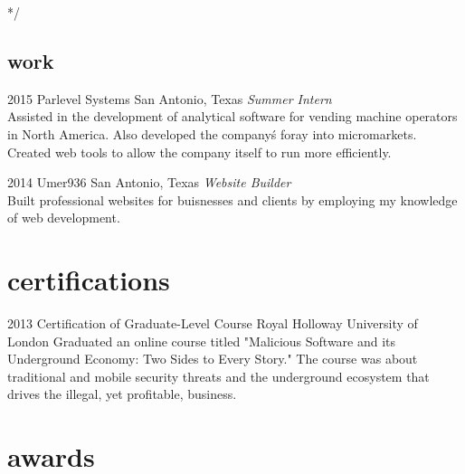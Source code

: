 \documentclass[]{friggeri-cv} %
\begin{document}
*/ 

\subsection{work}

\begin{entrylist}

\entry
{2015}
{Parlevel Systems}
{San Antonio, Texas}
{\emph{Summer Intern} \\
Assisted in the development of analytical software for vending machine operators in North America. Also developed the company\'s foray into micromarkets. Created web tools to allow the company itself to run more efficiently.}


\entry
{2014}
{Umer936}
{San Antonio, Texas}
{\emph{Website Builder} \\
Built professional websites for buisnesses and clients by employing my knowledge of web development.}


\end{entrylist}


\section{certifications}

\begin{entrylist}


\entry
{2013}
{Certification of Graduate-Level Course}
{Royal Holloway University of London}
{Graduated an online course titled "Malicious Software and its Underground Economy: Two Sides to Every Story." The course was about traditional and mobile security threats and the underground ecosystem that drives the illegal, yet profitable, business.}


\end{entrylist} 

\section{awards}
\end{document}

